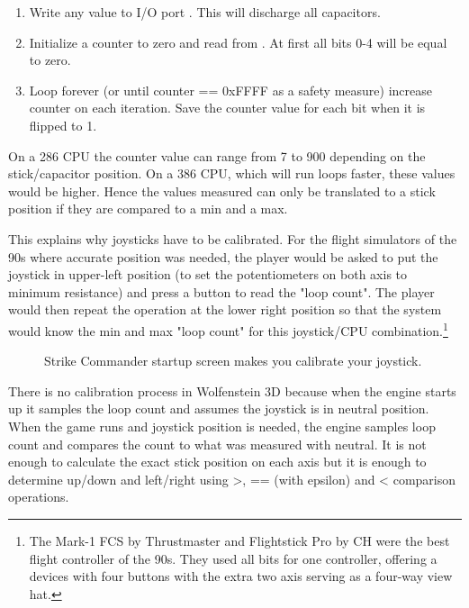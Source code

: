 \begin{enumerate}
 \item Write  any value to I/O port . This will discharge all capacitors.
 \item Initialize a counter to zero and read  from . At first all bits 0-4 will be equal to zero.
 \item Loop forever (or until counter == 0xFFFF as a safety measure) increase counter on each iteration. Save the counter value for each bit when it is flipped to 1.
\end{enumerate}
\par
On a 286 CPU the counter value can range from 7 to 900 depending on the stick/capacitor position. On a 386 CPU, which will run loops faster, these values would be higher. Hence the values measured can only be translated to a stick position if they are compared to a min and a max.\\
\par 
This explains why joysticks have to be calibrated. For the flight simulators of the 90s where accurate position was needed, the player would be asked to put the joystick in upper-left position (to set the potentiometers on both axis to minimum resistance) and press a button to read the "loop count". The player would then repeat the operation at the lower right position so that the system  would know the min and max "loop count" for this joystick/CPU combination.\footnote{The Mark-1 FCS by Thrustmaster and Flightstick Pro by CH were the best flight controller of the 90s. They used all bits for one controller, offering a devices with four buttons with the extra two axis serving as a four-way view hat.}\\
\par
\begin{figure}[H]
\centering
{}
\caption{Strike Commander startup screen makes you calibrate your joystick.}
\end{figure}
\par
There is no calibration process in Wolfenstein 3D because when the engine starts up it samples the loop count and assumes the joystick is in neutral position. When the game runs and joystick position is needed, the engine samples loop count and compares the count to what was measured with neutral. It is not enough to calculate the exact stick position on each axis but it is enough to determine up/down and left/right using >, == (with epsilon) and < comparison operations.

